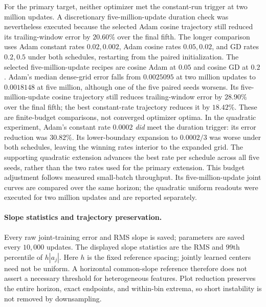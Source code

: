 For the primary target, neither optimizer met the constant-run trigger at
two million updates. A discretionary five-million-update duration check was
nevertheless executed because the selected Adam cosine trajectory still reduced
its trailing-window error by $20.60\%$ over the final fifth. The longer
comparison uses Adam constant rates $0.02,0.002$, Adam cosine rates
$0.05,0.02$, and GD rates $0.2,0.5$ under both schedules, restarting from the
paired initialization. The selected five-million-update recipes are cosine
Adam at $0.05$ and cosine GD at $0.2$. Adam's median dense-grid error falls
from $0.0025095$ at two million updates to $0.0018148$ at five million,
although one of the five paired seeds worsens. Its five-million-update
cosine trajectory still reduces trailing-window error by $28.90\%$ over
the final fifth; the best constant-rate trajectory reduces it by $18.42\%$.
These are finite-budget comparisons, not converged optimizer optima.
In the quadratic experiment, Adam's constant
rate $0.0002$ \emph{did} meet the duration trigger: its error reduction was
$30.82\%$. Its lower-boundary expansion to $0.0002/3$ was worse under both
schedules, leaving the winning rates interior to the expanded grid.
The supporting quadratic extension advances the best rate per schedule
across all five seeds, rather than the two rates used for the primary
extension. This budget adjustment follows measured small-batch throughput.
Its five-million-update joint curves are compared over the same horizon;
the quadratic uniform readouts were executed for two million updates and
are reported separately.

\paragraph{Slope statistics and trajectory preservation.}
Every raw joint-training error and RMS slope is saved; parameters are saved
every $10{,}000$ updates. The displayed slope statistics are the RMS and
$99$th percentile of $h|a_j|$. Here $h$ is the fixed reference spacing;
jointly learned centers need not be uniform. A horizontal common-slope
reference therefore does not assert a necessary threshold for heterogeneous
features. Plot reduction preserves the entire horizon, exact endpoints, and
within-bin extrema, so short instability is not removed by downsampling.

